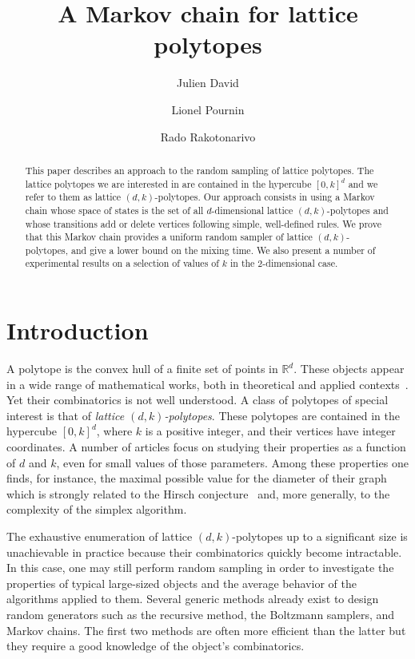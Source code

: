 \documentclass[a4paper]{article}
\title{A Markov chain for lattice polytopes}
\author{
Julien David%
\and
Lionel Pournin%
\and
Rado Rakotonarivo%
}
\begin{document}
\maketitle

\begin{abstract}
This paper describes an approach to the random sampling of lattice polytopes. The lattice polytopes we are interested in are contained in the hypercube $[0,k]^d$ and we refer to them as lattice $(d,k)$-polytopes. Our approach consists in using a Markov chain whose space of states is the set of all $d$-dimensional lattice $(d,k)$-polytopes and whose transitions add or delete vertices following simple, well-defined rules. We prove that this Markov chain provides a uniform random sampler of lattice $(d, k)$-polytopes, and give a lower bound on the mixing time. We also present a number of experimental results on a selection of values of $k$ in the $2$-dimensional case.
\end{abstract}
\vskip 32pt

\section{Introduction}

A polytope is the convex hull of a finite set of points in $\mathbb{R}^d$. These objects appear in a wide range of mathematical works, both in theoretical and applied contexts~\cite{ziegler1995lectures}. Yet their combinatorics is not well understood. A class of polytopes of special interest is that of \emph{lattice $(d,k)$-polytopes}. These polytopes are contained in the hypercube $[0,k]^d$, where $k$ is a positive integer, and their vertices have integer coordinates. A number of articles focus on studying their properties as a function of $d$ and $k$, even for small values of those parameters. Among these properties one finds, for instance, the maximal possible value for the diameter of their graph~\cite{DelPiaMichini2016,DezaManoussakisOnn2018,DezaPournin2018,KleinschmidtOnn1992,Naddef1989} which is strongly related to the Hirsch conjecture~\cite{BonifasDiSummaEisenbrandHahnleNiemeier2014,BorgwardtDeLoeraFinhold2016,KalaiKleitman1992,KleeWalkup1967,Santos2012} and, more generally, to the complexity of the simplex algorithm.

The exhaustive enumeration of lattice $(d,k)$-polytopes up to a significant size is unachievable in practice because their combinatorics quickly become intractable. In this case, one may still perform random sampling in order to investigate the properties of typical large-sized objects and the average behavior of the algorithms applied to them. Several generic methods already exist to design random generators such as the recursive method, the Boltzmann samplers, and Markov chains. The first two methods are often more efficient than the latter but they require a good knowledge of the object's combinatorics.
\end{document}
